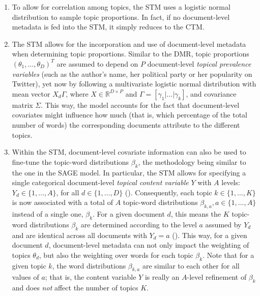 \documentclass[12pt]{article}
\begin{document}
\begin{enumerate}[label=(\roman*)]
\vspace{-0.25cm}
\item To allow for correlation among topics, the STM uses a logistic normal distribution to sample topic proportions. In fact, if no document-level metadata is fed into the STM, it simply reduces to the CTM.
\vspace{-0.25cm}
\item The STM allows for the incorporation and use of document-level metadata when determining topic proportions. Similar to the DMR, topic proportions $(\theta_1,\dots,\theta_D)^T$ are assumed to depend on $P$ document-level \textit{topical prevalence variables} (such as the author's name, her political party or her popularity on Twitter), yet now by following a multivariate logistic normal distribution with mean vector $X_d\Gamma$, where $X \in \mathbb{R}^{D \times P}$ and $\Gamma = [\gamma_1|\dots|\gamma_k]$, and covariance matrix $\Sigma$. This way, the model accounts for the fact that document-level covariates might influence how much (that is, which percentage of the total number of words) the corresponding documents attribute to the different topics.
\vspace{-0.25cm}
\item Within the STM, document-level covariate information can also be used to fine-tune the topic-word distributions $\beta_k$, the methodology being similar to the one in the SAGE model. In particular, the STM allows for specifying a single categorical document-level \textit{topical content variable} $Y$ with $A$ levels: $Y_d \in \{1,\dots,A\}$, for all $d \in \{1,\dots,D\}$ (\citealp{stm}). Consequently, each topic $k \in \{1,\dots,K\}$ is now associated with a total of $A$ topic-word distributions $\beta_{k,a}, a \in \{1,\dots,A\}$ instead of a single one, $\beta_k$. For a given document $d$, this means the $K$ topic-word distributions $\beta_k$ are determined according to the level $a$ assumed by $Y_d$ and are identical across all documents with $Y_d = a$ (\citealp{roberts2016model}). This way, for a given document $d$, document-level metadata can not only impact the weighting of topics $\theta_d$, but also the weighting over words for each topic $\beta_k$. Note that for a given topic $k$, the word distributions $\beta_{k,a}$ are similar to each other for all values of $a$; that is, the content variable $Y$ is really an $A$-level refinement of $\beta_k$ and does \textit{not} affect the number of topics $K$.

\end{enumerate}
\end{document}
